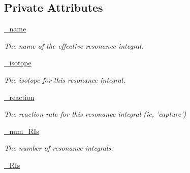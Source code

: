 \subsection*{Private Attributes}
\begin{DoxyCompactItemize}
\item 
\hypertarget{classpinspec_1_1process_1_1RITrue_aec037fce18c6deae420b010206535fd1}{\hyperlink{classpinspec_1_1process_1_1RITrue_aec037fce18c6deae420b010206535fd1}{\-\_\-name}}\label{classpinspec_1_1process_1_1RITrue_aec037fce18c6deae420b010206535fd1}

\begin{DoxyCompactList}\small\item\em The name of the effective resonance integral. \end{DoxyCompactList}\item 
\hypertarget{classpinspec_1_1process_1_1RITrue_a9bba42c02cf6b46cc92173027fcfc797}{\hyperlink{classpinspec_1_1process_1_1RITrue_a9bba42c02cf6b46cc92173027fcfc797}{\-\_\-isotope}}\label{classpinspec_1_1process_1_1RITrue_a9bba42c02cf6b46cc92173027fcfc797}

\begin{DoxyCompactList}\small\item\em The isotope for this resonance integral. \end{DoxyCompactList}\item 
\hyperlink{classpinspec_1_1process_1_1RITrue_aee6f864082130f6580a2e6173593bdcf}{\-\_\-reaction}
\begin{DoxyCompactList}\small\item\em The reaction rate for this resonance integral (ie, 'capture') \end{DoxyCompactList}\item 
\hypertarget{classpinspec_1_1process_1_1RITrue_a6057570aeb3e2f5f1c8708b515d62401}{\hyperlink{classpinspec_1_1process_1_1RITrue_a6057570aeb3e2f5f1c8708b515d62401}{\-\_\-num\-\_\-\-R\-Is}}\label{classpinspec_1_1process_1_1RITrue_a6057570aeb3e2f5f1c8708b515d62401}

\begin{DoxyCompactList}\small\item\em The number of resonance integrals. \end{DoxyCompactList}\item 
\hypertarget{classpinspec_1_1process_1_1RITrue_a67e6e7f47d4db1c6625a7d3359e87eaf}{\hyperlink{classpinspec_1_1process_1_1RITrue_a67e6e7f47d4db1c6625a7d3359e87eaf}{\-\_\-\-R\-Is}}\label{classpinspec_1_1process_1_1RITrue_a67e6e7f47d4db1c6625a7d3359e87eaf}


\end{DoxyCompactItemize}
